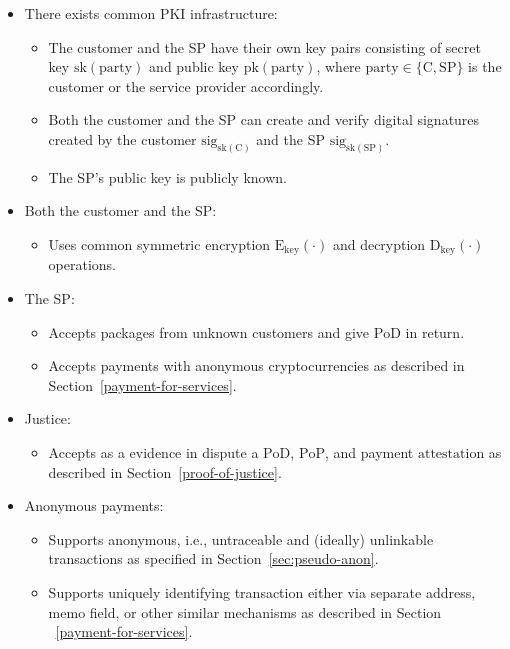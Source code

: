 \documentclass{ieeeaccess}
\begin{document}
\begin{itemize}
\item There exists common PKI infrastructure:
    \begin{itemize}
        \item The customer and the SP have their own key pairs consisting of secret key $\mathrm{sk}(\mathrm{party})$ and public key $\mathrm{pk}(\mathrm{party})$, where $\mathrm{party} \in \{\mathrm{C}, \mathrm{SP}\}$ is the customer or the service provider accordingly.
        \item Both the customer and the SP can create and verify digital signatures created by the customer $\mathrm{sig}_{\mathrm{sk}(\mathrm{C})}$ and the SP $\mathrm{sig}_{\mathrm{sk}(\mathrm{SP})}$.
        \item The SP's public key is publicly known.
    \end{itemize}
    
\item Both the customer and the SP:
    \begin{itemize}
        \item Uses common symmetric encryption $\mathrm{E}_\mathrm{key}(\cdot)$ and decryption $\mathrm{D}_\mathrm{key}(\cdot)$ operations.
    \end{itemize}

\item The SP:
    \begin{itemize}
        \item Accepts packages from unknown customers and give $\mathrm{PoD}$ in return.
        \item Accepts payments with anonymous cryptocurrencies as described in Section~\ref{payment-for-services}.
    \end{itemize}
    
\item Justice:
    \begin{itemize}
        \item Accepts as a evidence in dispute a $\mathrm{PoD}$, $\mathrm{PoP}$, and payment $\mathrm{attestation}$ as described in Section~\ref{proof-of-justice}.
    \end{itemize}

\item Anonymous payments:
    \begin{itemize}
        \item Supports anonymous, i.e., untraceable and (ideally) unlinkable transactions as specified in Section~\ref{sec:pseudo-anon}.
        \item Supports uniquely identifying transaction either via separate address, memo field, or other similar mechanisms as described in Section ~\ref{payment-for-services}. 
    \end{itemize}


\end{itemize}
\end{document}
